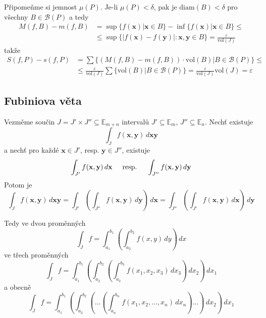 \documentclass[../main.tex]{subfiles}
\begin{document}
\noindent
\hspace{1.2mm}
Připomeňme si jemnost $\mu (P)$. Je-li $\mu (P) < \delta$, pak je $\textrm{diam}(B) < \delta$ pro všechny
$ B \in \mathcal{B}(P) $ a tedy
\begin{align*}
    M(f, B) - m(f, B) &= \sup\{ f(\mathbf{x})|\mathbf{x} \in B \} -
    \inf\{ f(\mathbf{x})|\mathbf{x} \in B\}\leq\\
    &\leq \sup\{ |f(\mathbf{x}) - f(\mathbf{y})|: \mathbf{x}, \mathbf{y} \in B \}
    = \frac{\varepsilon}{\textrm{vol}(J)}
\end{align*}
takže
\begin{align*}
    S(f,P) - s(f,P) &= \sum \{ (M(f,B) - m(f,B))\cdot \textrm{vol}(B)|B\in \mathcal{B}(P) \}\leq\\
    &\leq \frac{\varepsilon}{\textrm{vol}(J)}\sum \{ \textrm{vol}(B)| B\in \mathcal{B}(P) \}
    = \frac{\varepsilon}{\textrm{vol}(J)}\textrm{vol}(J) = \varepsilon
\end{align*}

\subsection{Fubiniova věta}
\hspace{1.2mm}
Vezměme součin $J = J' \times J'' \subseteq \mathbb{E}_{m+n}$ intervalů $J' \subseteq \mathbb{E}_m$,
$J'' \subseteq \mathbb{E}_n$. Nechť existuje
\[ \int_{J} f(\mathbf{x}, \mathbf{y}) \,d\mathbf{xy} \]
a nechť pro každé $\mathbf{x} \in J'$, resp. $\mathbf{y} \in J''$, existuje
\[ \int_{J'} f(\mathbf{x}, \mathbf{y}) \,d\mathbf{x}
\hspace{5mm}\textrm{resp.}\hspace{5mm}
\int_{J''} f(\mathbf{x}, \mathbf{y}) \,d\mathbf{y} \]
Potom je
\[ \int_J f(\mathbf{x}, \mathbf{y}) \,d\mathbf{xy} =
\int_{J'} \left( \int_{J''} f(\mathbf{x}, \mathbf{y}) \,d\mathbf{y} \right) \,d\mathbf{x} = 
\int_{J''} \left( \int_{J'} f(\mathbf{x}, \mathbf{y}) \,d\mathbf{x} \right) \,d\mathbf{y}\]

\vspace{10mm}
\noindent
Tedy ve dvou proměnných
\[ \int_{J} f = \int_{a_1}^{b_1} \left( \int_{a_2}^{b_2} f(x,y) \,dy \right) \,dx \]
ve třech proměnných
\[ \int_{J} f =
\int_{a_1}^{b_1} \left(
\int_{a_2}^{b_2} \left(
\int_{a_3}^{b_3} f(x_1, x_2, x_3) \,dx_3 \right) \,dx_2 \right) \,dx_1 \]
a obecně
\[ \int_{J} f =
\int_{a_1}^{b_1} \left(
\int_{a_2}^{b_2} \left(
\dots \left(
\int_{a_n}^{b_n} f(x_1, x_2, ..., x_n) \,dx_n \right) \dots \right) \,dx_2 \right) \,dx_1 \]
\end{document}

